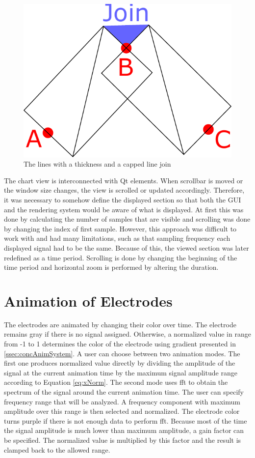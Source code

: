 \begin{figure}[htb]
	\centering
	\includegraphics[width=0.6\linewidth, height=0.2\textheight]{fig/linesAndJoin.pdf}
	\caption{The lines with a thickness and a capped line join}
	\label{fig:LinesAndJoin}
\end{figure}

The chart view is interconnected with Qt elements. When scrollbar is moved or the window size changes, the view is scrolled or updated accordingly. Therefore, it was necessary to somehow define the displayed section so that both the GUI and the rendering system would be aware of what is displayed. At first this was done by calculating the number of samples that are visible and scrolling was done by changing the index of first sample. However, this approach was difficult to work with and had many limitations, such as that sampling frequency each displayed signal had to be the same. Because of this, the viewed section was later redefined as a time period. Scrolling is done by changing the beginning of the time period and horizontal zoom is performed by altering the duration. 

\section{Animation of Electrodes}
\label{sec:animSystem}
The electrodes are animated by changing their color over time. The electrode remains gray if there is no signal assigned. Otherwise, a normalized value in range from -1 to 1 determines the color of the electrode using gradient presented in \ref{ssec:concAnimSystem}. A user can choose between two animation modes. The first one produces normalized value directly by dividing the amplitude of the signal at the current animation time by the maximum signal amplitude range according to Equation \ref{eq:xNorm}. The second mode uses \gls{fft} to obtain the spectrum of the signal around the current animation time. The user can specify frequency range that will be analyzed. A frequency component with maximum amplitude over this range is then selected and normalized. The electrode color turns purple if there is not enough data to perform \gls{fft}. Because most of the time the signal amplitude is much lower than maximum amplitude, a gain factor can be specified. The normalized value is multiplied by this factor and the result is clamped back to the allowed range.

